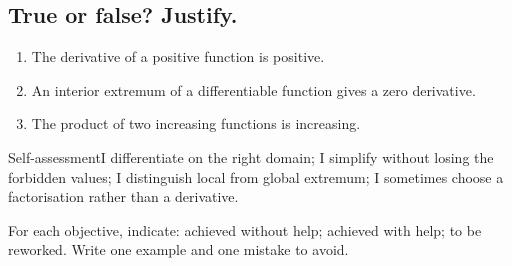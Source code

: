 \subsection*{True or false? Justify.}\label{C06-VF}
\begin{enumerate}
\item The derivative of a positive function is positive.
\item An interior extremum of a differentiable function gives a zero derivative.
\item The product of two increasing functions is increasing.
\end{enumerate}
\begin{repere}{Self-assessment}I differentiate on the right domain; I simplify without losing the forbidden values; I distinguish local from global extremum; I sometimes choose a factorisation rather than a derivative.

For each objective, indicate: achieved without help; achieved with help; to be reworked. Write one example and one mistake to avoid.\end{repere}
\endgroup
\ifprof\fi
